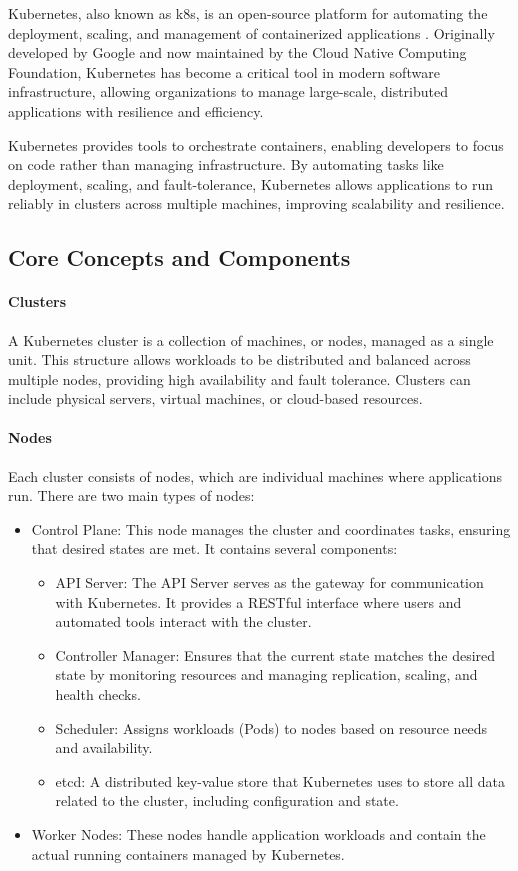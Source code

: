 \documentclass[main.tex]{subfiles}
\begin{document}
Kubernetes, also known as k8s, is an open-source platform for automating the deployment, scaling, and management of containerized applications \cite{kubernetes-main}. Originally developed by Google and now maintained by the Cloud Native Computing Foundation, Kubernetes has become a critical tool in modern software infrastructure, allowing organizations to manage large-scale, distributed applications with resilience and efficiency.

Kubernetes provides tools to orchestrate containers, enabling developers to focus on code rather than managing infrastructure. By automating tasks like deployment, scaling, and fault-tolerance, Kubernetes allows applications to run reliably in clusters across multiple machines, improving scalability and resilience.

\subsection{Core Concepts and Components}

\paragraph{Clusters}
A Kubernetes cluster is a collection of machines, or nodes, managed as a single unit. This structure allows workloads to be distributed and balanced across multiple nodes, providing high availability and fault tolerance. Clusters can include physical servers, virtual machines, or cloud-based resources.

\paragraph{Nodes}
Each cluster consists of nodes, which are individual machines where applications run. There are two main types of nodes:

\begin{itemize}
    \item Control Plane: This node manages the cluster and coordinates tasks, ensuring that desired states are met. It contains several components:
        \begin{itemize}
            \item API Server: The API Server serves as the gateway for communication with Kubernetes. It provides a RESTful interface where users and automated tools interact with the cluster.
            \item Controller Manager: Ensures that the current state matches the desired state by monitoring resources and managing replication, scaling, and health checks.
            \item Scheduler: Assigns workloads (Pods) to nodes based on resource needs and availability.
            \item etcd: A distributed key-value store that Kubernetes uses to store all data related to the cluster, including configuration and state.
        \end{itemize}
    \item Worker Nodes: These nodes handle application workloads and contain the actual running containers managed by Kubernetes.
\end{itemize}
\end{document}
